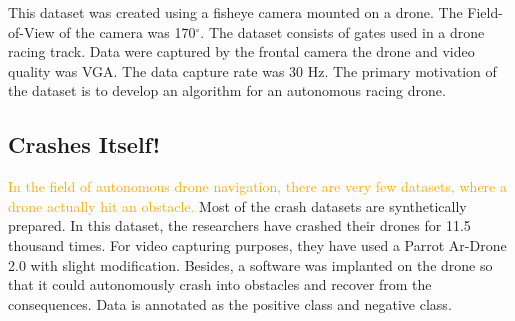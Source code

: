 This dataset was created using a fisheye camera mounted on a drone. The Field-of-View of the camera was 170$^{\circ}$. The dataset consists of gates used in a drone racing track. Data were captured by the frontal camera the drone and video quality was VGA. The data capture rate was 30 Hz. The primary motivation of the dataset is to develop an algorithm for an autonomous racing drone.


\subsection{Crashes Itself!}

\textcolor{orange}{In the field of autonomous drone navigation, there are very few datasets, where a drone actually hit an obstacle.} Most of the crash datasets are synthetically prepared. In this dataset, the researchers have crashed their drones for 11.5 thousand times. For video capturing purposes, they have used a Parrot Ar-Drone 2.0 with slight modification. Besides, a software was implanted on the drone so that it could autonomously crash into obstacles and recover from the consequences. Data is annotated as the positive class and negative class.